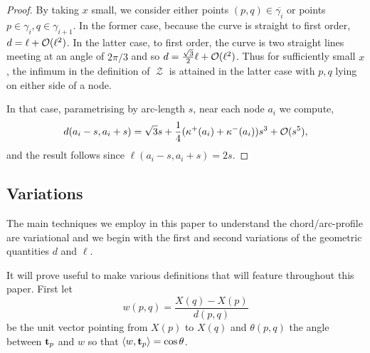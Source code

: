\documentclass[11pt]{amsart}
\DeclareMathOperator{\chordarcprofile}{\mathcal{Z}}
\begin{document}
\begin{proof}
By taking $x$ small, we consider either points $(p,q) \in \overline{\gamma_i}$ or points $p \in \gamma_i, q \in \gamma_{i+1}$. In the former case, because the curve is straight to first order, $d = \ell + \operatorname{\mathcal{O}}(\ell^2)$. In the latter case, to first order, the curve is two straight lines meeting at an angle of $2\pi/3$ and so $d = \tfrac{\sqrt{3}}{2} \ell + \operatorname{\mathcal{O}}(\ell^2)$. Thus for sufficiently small $x$, the infimum in the definition of $\chordarcprofile$ is attained in the latter case with $p,q$ lying on either side of a node.

In that case, parametrising by arc-length $s$, near each node $a_i$ we compute,
\[
d(a_i - s, a_i + s) = \sqrt{3} s + \frac{1}{4} (\operatorname{\kappa}^+(a_i) + \operatorname{\kappa}^-(a_i))s^3 + \operatorname{\mathcal{O}}(s^5),
\]
and the result follows since $\ell(a_i-s, a_i+s) = 2s$.
\end{proof}

\subsection{Variations}
\label{sec:orgheadline8}

The main techniques we employ in this paper to understand the chord/arc-profile are variational and we begin with the first and second variations of the geometric quantities \(d\) and \(\ell\).

It will prove useful to make various definitions that will feature throughout this paper. First let
\[
w(p, q) = \frac{X(q) - X(p)}{d(p,q)}
\]
be the unit vector pointing from \(X(p)\) to \(X(q)\) and \(\theta(p,q)\) the angle between \(\operatorname{\mathbf{t}}_{p}\) and \(w\) so that \(\langle{w},{\operatorname{\mathbf{t}}_p}\rangle = \cos\theta\). 
\end{document}
